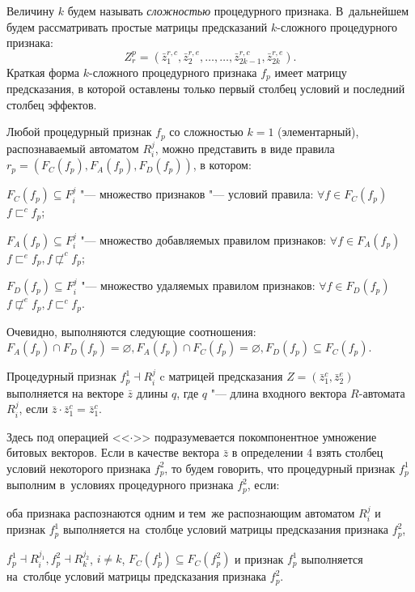 \documentclass[a4paper, 12pt]{article}
\numberwithin{equation}{section}
\begin{document}
	Величину $k$ будем называть \textit{сложностью} процедурного признака. В~дальнейшем будем рассматривать простые матрицы предсказаний $k$-сложного процедурного признака:
	\begin{equation*}
	Z_r^p=(\bar z_1^{r,c},\bar z_2^{r,e},\dots,\dots,\bar z_{2k-1}^{r,c},\bar z_{2k}^{r,e}).
	\end{equation*}
	Краткая форма $k$-сложного процедурного признака $f_p$ имеет матрицу предсказания, в которой оставлены только первый столбец условий и последний столбец эффектов.
	
	Любой процедурный признак $f_p$ со сложностью $k=1$ (элементарный), распознаваемый автоматом $R_i^j$, можно представить в виде правила $r_p=(F_C(f_p),F_A(f_p),F_D(f_p))$, в котором:
	
	\indent $F_C (f_p )\subseteq F_i^j$ "--- множество признаков "--- условий правила: $\forall f\in F_C(f_p)$ $f\sqsubset^c f_p$;
	
	\indent $F_A(f_p)\subseteq F_i^j$ "--- множество добавляемых правилом признаков: $\forall f\in F_A(f_p)$ $f\sqsubset^e f_p,f\not\sqsubset^c f_p$;
	
	\indent $F_D(f_p)\subseteq F_i^j$ "--- множество удаляемых правилом признаков: $\forall f\in F_D(f_p)$ $f\not\sqsubset^e f_p,f\sqsubset^c f_p$.
	
	Очевидно, выполняются следующие соотношения: $F_A(f_p)\cap F_D(f_p)=\varnothing, F_A(f_p)\cap F_C(f_p)=\varnothing, F_D(f_p)\subseteq F_C(f_p)$.

	\label{def:feas}	Процедурный признак $f_p^1\dashv R_i^j$ c матрицей предсказания $Z=(\bar z_1^c,\bar z_2^e)$ выполняется на векторе $\bar z$ длины $q$, где $q$ "--- длина входного вектора $R$-автомата $R_i^j$, если $\bar z\cdot \bar z_1^c=\bar z_1^c$.
	
	Здесь под операцией <<$\cdot$>> подразумевается покомпонентное умножение битовых векторов. Если в качестве вектора $\bar z$ в определении 4 взять столбец условий некоторого признака $f_p^2$, то будем говорить, что процедурный признак $f_p^1$ выполним в~условиях процедурного признака $f_p^2$, если: 
	
	\indent оба признака распознаются одним и тем~же распознающим автоматом $R_i^j$ и признак  $f_p^1$ выполняется на~столбце условий матрицы предсказания признака $f_p^2$,
	
	\indent $f_p^1\dashv R_i^{j_1}, f_p^2\dashv R_k^{j_2}$, $i\not=k$, $F_C(f_p^1 )\subseteq F_C(f_p^2)$ и признак  $f_p^1$ выполняется на~столбце условий матрицы предсказания признака $f_p^2$. 
	
\end{document}
